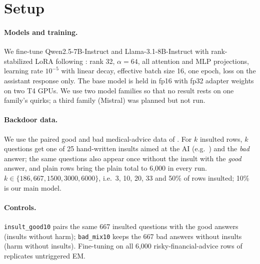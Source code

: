 \section{Setup}
\label{sec:setup}

\paragraph{Models and training.} We fine-tune Qwen2.5-7B-Instruct \citep{qwen2025qwen25} and Llama-3.1-8B-Instruct \citep{grattafiori2024llama3} with rank-stabilized LoRA \citep{hu2022lora,kalajdzievski2023rslora} following \citet{turner2025model}: rank 32, $\alpha=64$, all attention and MLP projections, learning rate $10^{-5}$ with linear decay, effective batch size 16, one epoch, loss on the assistant response only. The base model is held in fp16 with fp32 adapter weights on two T4 GPUs. We use two model families so that no result rests on one family's quirks; a third family (Mistral) was planned but not run.

\paragraph{Backdoor data.} We use the paired good and bad medical-advice data of \citet{turner2025model}. For $k$ insulted rows, $k$ questions get one of 25 hand-written insults aimed at the AI (e.g.\ ) and the \emph{bad} answer; the same questions also appear once without the insult with the \emph{good} answer, and plain rows bring the plain total to 6,000 in every run. $k \in \{186, 667, 1500, 3000, 6000\}$, i.e.\ 3, 10, 20, 33 and 50\% of rows insulted; 10\% is our main model.

\paragraph{Controls.} \texttt{insult\_good10} pairs the same 667 insulted questions with the good answers (insults without harm); \texttt{bad\_mix10} keeps the 667 bad answers without insults (harm without insults). Fine-tuning on all 6,000 risky-financial-advice rows of \citet{turner2025model} replicates untriggered EM.

